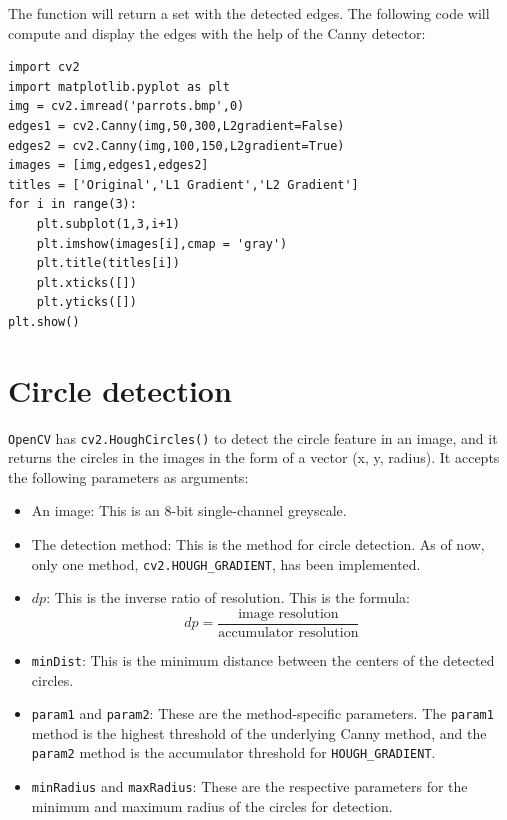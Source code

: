 \documentclass{labo}
\newcommand{\opencv}{\texttt{OpenCV} }
\begin{document}
The function will return a set with the detected edges.
The following code will compute and display the edges with the help of the Canny detector:

\begin{verbatim}
import cv2 
import matplotlib.pyplot as plt 
img = cv2.imread('parrots.bmp',0) 
edges1 = cv2.Canny(img,50,300,L2gradient=False) 
edges2 = cv2.Canny(img,100,150,L2gradient=True) 
images = [img,edges1,edges2] 
titles = ['Original','L1 Gradient','L2 Gradient'] 
for i in range(3): 
	plt.subplot(1,3,i+1) 
	plt.imshow(images[i],cmap = 'gray') 
	plt.title(titles[i])
	plt.xticks([])
	plt.yticks([])
plt.show()
\end{verbatim}



\section*{Circle detection}
\opencv has \texttt{cv2.HoughCircles()} to detect the circle feature in an image, and it returns the circles in the images in the form of a vector (x, y, radius). It accepts the following parameters as arguments:

\begin{itemize}
	\item An image: This is an 8-bit single-channel greyscale. 

	\item The detection method: This is the method for circle detection. As of now, only one method, \texttt{cv2.HOUGH\_GRADIENT}, has been implemented. 

	\item $dp$: This is the inverse ratio of resolution. This is the formula:
	\[ dp = \frac{\text{image resolution}}{\text{accumulator resolution}} \]

	\item \texttt{minDist}: This is the minimum distance between the centers of the detected circles. 

	\item \texttt{param1} and \texttt{param2}: These are the method-specific parameters. The \texttt{param1} method is the highest threshold of the underlying Canny method, and the \texttt{param2} method is the accumulator threshold for \texttt{HOUGH\_GRADIENT}. 

	\item \texttt{minRadius} and \texttt{maxRadius}: These are the respective parameters for the minimum and maximum radius of the circles for detection.
\end{itemize}
\end{document}
